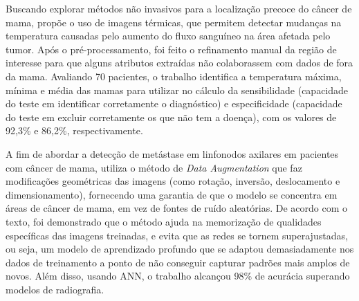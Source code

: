Buscando explorar métodos não invasivos para a localização precoce do câncer de mama,  propõe o uso de imagens térmicas, que permitem detectar mudanças na temperatura causadas pelo aumento do fluxo sanguíneo na área afetada pelo tumor. Após o pré-processamento, foi feito o refinamento manual da região de interesse para que alguns atributos extraídas não colaborassem com dados de fora da mama. Avaliando 70 pacientes, o trabalho identifica a temperatura máxima, mínima e média das mamas para utilizar no cálculo da sensibilidade (capacidade do teste em identificar corretamente o diagnóstico) e especificidade (capacidade do teste em excluir corretamente os que não tem a doença), com os valores de 92,3\% e 86,2\%, respectivamente.

A fim de abordar a detecção de metástase em linfonodos axilares em pacientes com câncer de mama,  utiliza o método de \textit{Data Augmentation} que faz modificações geométricas das imagens (como rotação, inversão, deslocamento e dimensionamento), fornecendo uma garantia de que o modelo se concentra em áreas de câncer de mama, em vez de fontes de ruído aleatórias. De acordo com o texto, foi demonstrado que o método ajuda na memorização de qualidades específicas das imagens treinadas, e evita que as redes se tornem superajustadas, ou seja, um modelo de aprendizado profundo que se adaptou demasiadamente nos dados de treinamento a ponto de não conseguir capturar padrões mais amplos de novos. Além disso, usando ANN, o trabalho alcançou 98\% de acurácia superando modelos de radiografia.






